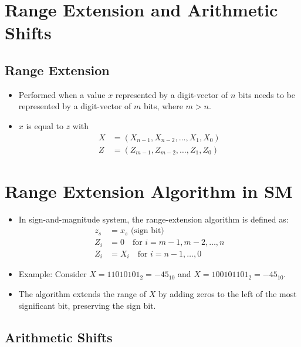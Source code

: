 \documentclass[12pt,openany, tikz,border=10pt]{book}
\begin{document}
  \section{Range Extension
  and Arithmetic Shifts}
\subsection{Range Extension}



\begin{itemize}
  \item[] Performed when a value \( x \) represented by a digit-vector of \( n \) bits needs to be represented by a digit-vector of \( m \) bits, where \( m > n \).
  \item[] \( x \) is equal to \( z \) with
  \begin{align*}
      X &= (X_{n-1}, X_{n-2}, \ldots, X_1, X_0) \\
      Z &= (Z_{m-1}, Z_{m-2}, \ldots, Z_1, Z_0)
  \end{align*}
\end{itemize}

\small \section{Range Extension Algorithm in SM}

\begin{itemize}
    \item[] In sign-and-magnitude system, the range-extension algorithm is defined as:
    \begin{align*}
        z_s &= x_s \text{ (sign bit)} \\
        Z_i &= 0 \quad \text{for } i = m - 1, m - 2, \ldots, n \\
        Z_i &= X_i \quad \text{for } i = n - 1, \ldots, 0
    \end{align*}
    \item[] Example: Consider \( X = 11010101_2 = -45_{10} \) and \( X = 100101101_2 = -45_{10} \).
    \item[] The algorithm extends the range of \( X \) by adding zeros to the left of the most significant bit, preserving the sign bit.
\end{itemize}


\subsection{Arithmetic Shifts}
\end{document}
